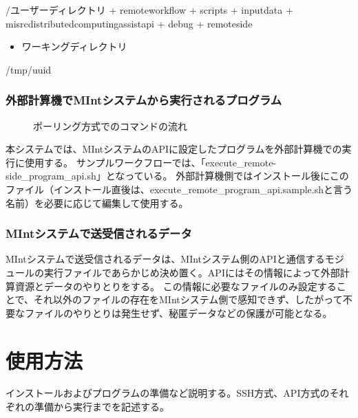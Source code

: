 \documentclass[letterpaper,10pt,dvipdfmx,openany]{sphinxmanual}
\begin{document}
%
\begin{sphinxVerbatim}[commandchars=\\\{\}]
\PYGZti{}/ユーザーディレクトリ
  + remote\PYGZus{}workflow
    + scripts
      + input\PYGZus{}data
  + misrc\PYGZus{}distributed\PYGZus{}computing\PYGZus{}assist\PYGZus{}api
    + debug
      + remote\PYGZhy{}side
\end{sphinxVerbatim}
\begin{itemize}
\item {} 
ワーキングディレクトリ

\end{itemize}

%
\begin{sphinxVerbatim}[commandchars=\\\{\}]
/tmp/\PYGZlt{}uuid\PYGZgt{}
\end{sphinxVerbatim}


\subsection{外部計算機でMIntシステムから実行されるプログラム}
\label{\detokenize{using_distributed_properties:id22}}
\begin{figure}[htbp]
\centering
\capstart
\caption{ポーリング方式でのコマンドの流れ}\label{\detokenize{using_distributed_properties:id48}}\end{figure}

本システムでは、MIntシステムのAPIに設定したプログラムを外部計算機での実行に使用する。
サンプルワークフローでは、「execute\_remote-side\_program\_api.sh」となっている。
外部計算機側ではインストール後にこのファイル（インストール直後は、execute\_remote\_program\_api.sample.shと言う名前）を必要に応じて編集して使用する。


\subsection{MIntシステムで送受信されるデータ}
\label{\detokenize{using_distributed_properties:id23}}
MIntシステムで送受信されるデータは、MIntシステム側のAPIと通信するモジュールの実行ファイルであらかじめ決め置く。APIにはその情報によって外部計算資源とデータのやりとりをする。
この情報に必要なファイルのみ設定することで、それ以外のファイルの存在をMIntシステム側で感知できず、したがって不要なファイルのやりとりは発生せず、秘匿データなどの保護が可能となる。


\chapter{使用方法}
\label{\detokenize{using_distributed_properties:id24}}
インストールおよびプログラムの準備など説明する。SSH方式、API方式のそれぞれの準備から実行までを記述する。
\end{document}
